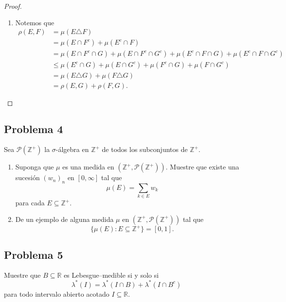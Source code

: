 \documentclass{article}
\theoremstyle{definition}
\theoremstyle{remark}
\numberwithin{equation}{section}
\renewcommand{\P}{\mathcal{P}}
\newcommand{\R}{\mathbb{R}}
\newcommand{\Z}{\mathbb{Z}}
\newcommand{\lam}{\lambda}
\newcommand{\oo}{\infty}
\begin{document}
\begin{proof}
\begin{enumerate}
    \item Notemos que 
    \begin{align*}
        \rho(E,F) &= \mu(E \triangle F) \\
        &= \mu(E \cap F^c) + \mu(E^c \cap F) \\
        &= \mu(E \cap F^c \cap G) + \mu(E \cap F^c \cap G^c) + \mu(E^c \cap F \cap G) + \mu(E^c \cap F \cap G^c) \\
        &\leq \mu(E^c \cap G) + \mu(E \cap G^c) + \mu(F^c \cap G) + \mu(F \cap G^c) \\
        &= \mu(E \triangle G) + \mu(F \triangle G) \\
        &= \rho(E,G) + \rho(F,G).
    \end{align*}
  \end{enumerate}
\end{proof}

\newpage
\subsection{Problema 4}

Sea $\P(\Z^+)$ la \( \sigma \)-álgebra en $\Z^+$ de todos los subconjuntos de $\Z^+$.

\begin{enumerate}
  \item Suponga que $\mu$ es una medida en $(\Z^+,\P(\Z^+))$. Muestre que existe una sucesión $(w_n)_n$ en $[0,\oo]$ tal que 
  \[ \mu(E) = \sum_{k \in E} w_k \]
  para cada $E \subseteq \Z^+$.
  \item De un ejemplo de alguna medida $\mu$ en $(\Z^+,\P(\Z^+))$ tal que 
  \[ \{\mu(E) \colon E \subseteq \Z^+\} = [0,1]. \]
\end{enumerate}


\newpage
\subsection{Problema 5}

Muestre que $B \subseteq \R$ es Lebesgue--medible si y solo si 
\[ \lam^*(I) = \lam^*(I \cap B) + \lam^*(I \cap B^c) \]
para todo intervalo abierto acotado $I \subseteq \R$.
\end{document}
